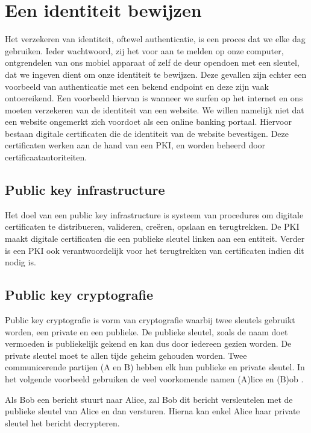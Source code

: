 \chapter{Een identiteit bewijzen}
\label{ch:identiteit-bewijzen}

Het verzekeren van identiteit, oftewel authenticatie, is een proces dat we elke
dag gebruiken. Ieder wachtwoord, zij het voor aan te melden op onze computer,
ontgrendelen van ons mobiel apparaat of zelf de deur opendoen met een sleutel,
dat we ingeven dient om onze identiteit te bewijzen. Deze gevallen zijn echter
een voorbeeld van authenticatie met een bekend endpoint en deze zijn vaak
ontoereikend. Een voorbeeld hiervan is wanneer we surfen op het internet en ons
moeten verzekeren van de identiteit van een website. We willen namelijk niet dat
een website ongemerkt zich voordoet als een online banking portaal. Hiervoor
bestaan digitale certificaten die de identiteit van de website bevestigen. Deze
certificaten werken aan de hand van een \gls{PKI},
en worden beheerd door certificaatautoriteiten.

\section{Public key infrastructure}
\label{sec:public-key-infrastructure}

Het doel van een public key infrastructure is systeem van procedures om digitale
certificaten te distribueren, valideren, creëren, opslaan en terugtrekken. De
\gls{PKI} maakt digitale certificaten die een publieke sleutel linken aan een
entiteit. Verder is een \gls{PKI} ook verantwoordelijk voor het terugtrekken van
certificaten indien dit nodig is.

\section{Public key cryptografie}
\label{sec:public-key-cryptografie}

Public key cryptografie is vorm van cryptografie waarbij twee sleutels gebruikt
worden, een private en een publieke. De publieke sleutel, zoals de naam doet
vermoeden is publiekelijk gekend en kan dus door iedereen gezien worden. De
private sleutel moet te allen tijde geheim gehouden worden. Twee communicerende
partijen (A en B) hebben elk hun publieke en private sleutel. In het volgende
voorbeeld gebruiken de veel voorkomende namen (A)lice en (B)ob
\autocite{Rivest1978}.

Als Bob een bericht stuurt naar Alice, zal Bob dit bericht versleutelen met de
publieke sleutel van Alice en dan versturen. Hierna kan enkel Alice haar private
sleutel het bericht decrypteren.

